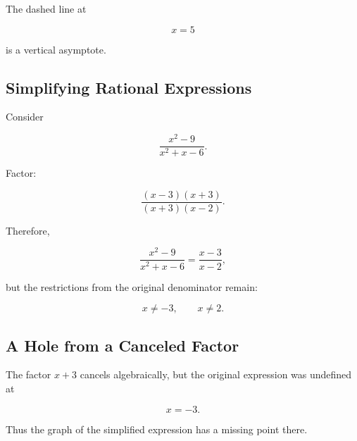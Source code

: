 The dashed line at

\[ x=5 \]

is a vertical asymptote.

\subsection{Simplifying Rational Expressions}
\label{subsec:simplifying-rational-expressions}

Consider

\[ \frac{x^2-9}{x^2+x-6}. \]

Factor:

\[ \frac{(x-3)(x+3)}{(x+3)(x-2)}. \]

Therefore,

\[ \frac{x^2-9}{x^2+x-6}=\frac{x-3}{x-2}, \]

but the restrictions from the original denominator remain:

\[ x\neq-3,\qquad x\neq2. \]

\subsection{A Hole from a Canceled Factor}
\label{subsec:rational-hole}

The factor \(x+3\) cancels algebraically, but the original expression was
undefined at

\[ x=-3. \]

Thus the graph of the simplified expression has a missing point there.

\begin{center}
\end{center}

